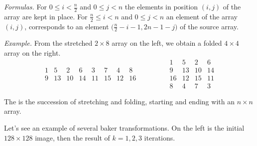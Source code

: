 \documentclass[11pt,class=report,crop=false]{standalone}
\begin{document}
\begin{cours}
\begin{itemize}
\emph{Formulas.} 
For $0 \le i < \frac n2$ and $0 \le j < n$ the elements in position $(i,j)$ of the array are kept in place.
For $\frac n2 \le i < n$ and $0 \le j < n$ an element of the array 
$(i,j)$, corresponds to an element $\big(\frac{n}{2} - i - 1,2n-1-j\big)$ of the source array. 


\emph{Example.} 
From the stretched $2 \times 8$ array on the left, we obtain a folded $4 \times 4$ array on the right. 
$$ 
\begin{array}{cccccccc} 
  1& 5& 2& 6& 3& 7& 4& 8  \\
  9&13&10&14&11&15&12&16
\end{array}\qquad\qquad
\begin{array}{cccc} 
  1& 5& 2& 6\\ 
  9& 13& 10& 14\\  
  16&12&15&11\\  
  8&4&7&3  
\end{array}$$
\end{itemize}


The  is the succession of stretching and folding, starting and ending with an $n \times n$ array.


Let's see an example of several baker transformations.
On the left is the initial $128 \times 128$ image, then the result of $k=1,2,3$ iterations. 


\end{cours}
\end{document}
